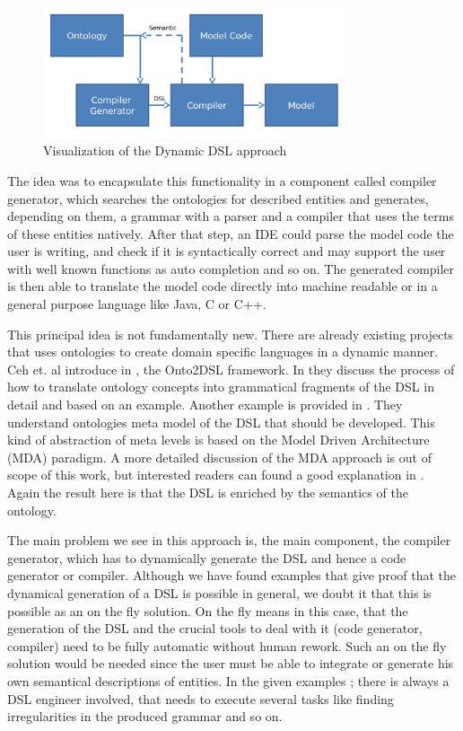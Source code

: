 \begin{figure}[h]
	\centering
	\includegraphics[width=0.8\textwidth]{pics/generation_of_a_dsl/binding1.png}
	\caption{Visualization of the Dynamic DSL approach \label{fig:visualisation_dyn_dsl}}	
\end{figure}
\par
The idea was to encapsulate this functionality in a component called compiler generator, which searches the ontologies for described entities and generates, depending on them, a grammar with a parser and a compiler that uses the terms of these entities natively. After that step, an IDE could parse the model code the user is writing, and check if it is syntactically correct and may support the user with well known functions as auto completion and so on. The generated compiler is then able to translate the model code directly into machine readable or in a general purpose language like Java, C or C++.
\par
This principal idea is not fundamentally new. There are already existing projects that uses ontologies to create domain specific languages in a dynamic manner. Ceh et. al introduce in \autocite{ontology:ontology2dsl}, \autocite{ontology:onto_in_dsl_dev} the Onto2DSL framework. In \autocite[192]{ontology:onto_in_dsl_dev} they discuss the process of how to translate ontology concepts into grammatical fragments of the DSL in detail and based on an example. Another example is provided in \autocite{ontology:combining_dsl_onto}. They understand ontologies meta model of the DSL that should be developed. This kind of abstraction of meta levels is based on the Model Driven Architecture (MDA) paradigm. A  more detailed discussion of the MDA approach is out of scope of this work, but interested readers can found a good explanation in \autocite{dsl:mda}. Again the result here is that the DSL is enriched by the semantics of the ontology.
\par
The main problem we see in this approach is, the main component, the compiler generator, which has to dynamically generate the DSL and hence a code generator or compiler. Although we have found examples that give proof that the dynamical generation of a DSL is possible in general, we doubt it that this is possible as an on the fly solution. On the fly means in this case, that the generation of the DSL and the crucial tools to deal with it (code generator, compiler) need to be fully automatic without human rework. Such an on the fly solution would be needed since the user must be able to integrate or generate his own semantical descriptions of entities. In the given examples \autocite{ontology:ontology2dsl}; \autocite{ontology:onto_in_dsl_dev} there is always a DSL engineer involved, that needs to execute several tasks like finding irregularities in the produced grammar and so on.

